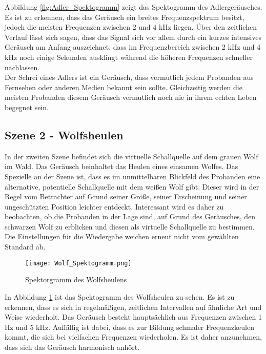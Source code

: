Abbildung \ref{fig:Adler_Spektogramm} zeigt das Spektogramm des Adlergeräusches. Es ist zu erkennen, dass das Geräusch ein breites Frequenzspektrum besitzt, jedoch die meisten Frequenzen zwischen 2 und 4 kHz liegen. Über den zeitlichen Verlauf lässt sich sagen, dass das Signal sich vor allem durch ein kurzes intensives Geräusch am Anfang auszeichnet, dass im Frequenzbereich zwischen 2 kHz und 4 kHz noch einige Sekunden ausklingt während die höheren Frequenzen schneller nachlassen.\\

 Der Schrei eines Adlers ist ein Geräusch, dass vermutlich jedem Probanden aus Fernsehen oder anderen Medien bekannt sein sollte. Gleichzeitig werden die meisten Probanden diesem Geräusch vermutlich noch nie in ihrem echten Leben begegnet sein. 

\subsection{Szene 2 - Wolfsheulen}

In der zweiten Szene befindet sich die virtuelle Schallquelle auf dem grauen Wolf im Wald. Das Geräusch beinhaltet das Heulen eines einsamen Wolfes. Das Spezielle an der Szene ist, dass es im unmittelbaren Blickfeld des Probanden eine alternative, potentielle Schallquelle mit dem weißen Wolf gibt. Dieser wird in der Regel vom Betrachter auf Grund seiner Größe, seiner Erscheinung und seiner ungeschützten Position leichter entdeckt. Interessant wird es daher zu beobachten, ob die Probanden in der Lage sind, auf Grund des Geräusches,  den schwarzen Wolf zu erblicken und diesen als virtuelle Schallquelle zu bestimmen.  Die Einstellungen für die Wiedergabe weichen erneut nicht vom gewählten Standard ab. 

 \begin{figure}[H]
\centering
\texttt{[image: Wolf\_Spektogramm.png]}
\caption{Spektorgramm des Wolfsheulens}
\label{fig:Wolf_Spektogramm}
\end{figure} 

In Abbildung \ref{fig:Wolf_Spektogramm} ist das Spektogramm des Wolfsheulen zu sehen. Es ist zu erkennen, dass es sich in regelmäßigen, zeitlichen Intervallen auf ähnliche Art und Weise wiederholt. Das Geräusch besteht hauptsächlich aus Frequenzen zwischen 1 Hz und 5 kHz. Auffällig ist dabei, dass es zur Bildung schmaler Frequenzkeulen kommt, die sich bei vielfachen Frequenzen wiederholen. Es ist daher anzunehmen, dass sich das Geräusch harmonisch anhört. \\


